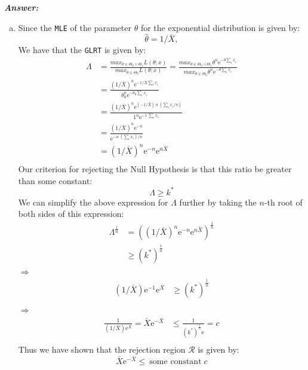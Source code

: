 \documentclass[12pt]{article}
\begin{document}
  \textbf{\color{TealBlue}\emph{Answer:} } 

\begin{enumerate}[(a)]

\item Since the \texttt{MLE} of the parameter $\theta$ for the exponential distribution is given by:
$$
\hat \theta = 1 / \bar X,
$$
We have that the \texttt{GLRT} is given by:
\begin{align*}
\Lambda &= \frac{max_{\theta \in \Theta_0 \cup \Theta_1} L(\theta; x) } {max_{\theta \in \Theta_0} L(\theta; x)  }
= \frac{max_{\theta \in \Theta_0 \cup \Theta_1} \theta^n \mathrm{e}^{-\theta \sum_i x_i} } {max_{\theta \in \Theta_0} \theta^n \mathrm{e}^{-\theta \sum_i x_i} }\\
&= \frac{(1 / \bar X)^n \mathrm{e}^{- 1/ \bar X \sum_i x_i }} {\theta_0^n \mathrm{e}^{-\theta_0 \sum_i x_i}} \\
&= \frac{(1 / \bar X)^n \mathrm{e}^{(- 1/ \bar X) \ n \ (\sum_i x_i / n) }}{1^n \mathrm{e}^{-1 \ \sum_i x_i}} \\
&=  \frac{(1 / \bar X)^n \mathrm{e}^{-n} } {\mathrm{e}^{-n \ (\sum_i x_i) / n}} \\
&= (1 / \bar X)^n \mathrm{e}^{ -n } \mathrm{e}^{n \bar X} \\
\end{align*}
Our criterion for rejecting the Null Hypothesis is that this ratio be greater than some constant:
$$
\Lambda \geq k^*
$$
We can simplify the above expression for $\Lambda$ further by taking the $n$-th root of both sides of this expression:
\begin{align*}
\Lambda^{\frac{1}{n}}  &=  \left( (1 / \bar X)^n \mathrm{e}^{ -n } \mathrm{e}^{n \bar X} \right)^{\frac{1}{n}}\\
&\geq  (k^*)^{\frac{1}{n}}
\end{align*}
$\Rightarrow$
\begin{align*}
 (1 / \bar X) \mathrm{e}^{ -1 } \mathrm{e}^{\bar X} & \geq (k^*)^{\frac{1}{n}} \\
\end{align*}
$\Rightarrow$
\begin{align*}
 \frac{1} {(1 / \bar X) \mathrm{e}^{\bar X}} =\bar X \mathrm{e}^{-\bar X}  & \leq \frac{1} {(k^*)^{\frac{1}{n}} \mathrm{e}} = c \\
\end{align*}
Thus we have shown that the rejection region $\mathcal{R}$ is given by:
$$
\boxed{\bar X \mathrm{e}^{-\bar X} \leq \ \text{some constant} \; c }
$$
\bigskip


\end{enumerate}
\end{document}
